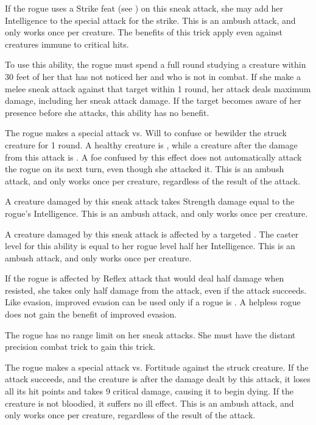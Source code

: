 If the rogue uses a Strike feat (see ) on this sneak attack, she may add her Intelligence to the special attack for the strike.
This is an ambush attack, and only works once per creature.
The benefits of this trick apply even against creatures immune to critical hits.

To use this ability, the rogue must spend a full round studying a creature within 30 feet of her that has not noticed her and who is not in combat.
If she make a melee sneak attack against that target within 1 round, her attack deals maximum damage, including her sneak attack damage.
If the target becomes aware of her presence before she attacks, this ability has no benefit.

The rogue makes a special attack vs. Will to confuse or bewilder the struck creature for 1 round.
A healthy creature is \bewildered, while a creature \bloodied after the damage from this attack is \confused.
A foe confused by this effect does not automatically attack the rogue on its next turn, even though she attacked it.
This is an ambush attack, and only works once per creature, regardless of the result of the attack.

A creature damaged by this sneak attack takes Strength damage equal to the rogue's Intelligence.
This is an ambush attack, and only works once per creature.

A creature damaged by this sneak attack is affected by a targeted .
The caster level for this ability is equal to her rogue level \add half her Intelligence.
This is an ambush attack, and only works once per creature.

If the rogue is affected by Reflex attack that would deal half damage when resisted, she takes only half damage from the attack, even if the attack succeeds.
Like evasion, improved evasion can be used only if a rogue is \unencumbered.
A helpless rogue does not gain the benefit of improved evasion.

The rogue has no range limit on her sneak attacks.
She must have the distant precision combat trick to gain this trick.

The rogue makes a special attack vs. Fortitude against the struck creature.
If the attack succeeds, and the creature is \bloodied after the damage dealt by this attack, it loses all its hit points and takes 9 critical damage, causing it to begin dying.
If the creature is not bloodied, it suffers no ill effect.
This is an ambush attack, and only works once per creature, regardless of the result of the attack.

